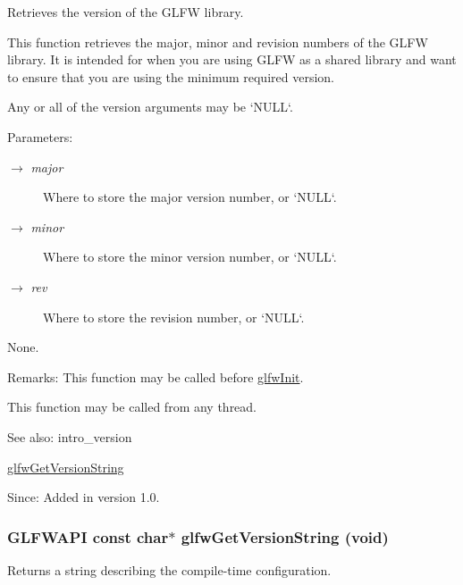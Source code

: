Retrieves the version of the GLFW library. 

This function retrieves the major, minor and revision numbers of the GLFW library. It is intended for when you are using GLFW as a shared library and want to ensure that you are using the minimum required version.

Any or all of the version arguments may be `NULL`.

\begin{Desc}
\item[Parameters:]
\begin{description}
\item[\mbox{$\rightarrow$} {\em major}]Where to store the major version number, or `NULL`. \item[\mbox{$\rightarrow$} {\em minor}]Where to store the minor version number, or `NULL`. \item[\mbox{$\rightarrow$} {\em rev}]Where to store the revision number, or `NULL`.\end{description}
\end{Desc}
None.

\begin{Desc}
\item[Remarks:]This function may be called before \hyperlink{group__init_gb41771f0215a2e0afb4cf1cf98082d40}{glfwInit}.\end{Desc}
This function may be called from any thread.

\begin{Desc}
\item[See also:]intro\_\-version 

\hyperlink{group__init_g4b9092ac5eace57d94d3cd551d6b8ded}{glfwGetVersionString}\end{Desc}
\begin{Desc}
\item[Since:]Added in version 1.0. \end{Desc}
\hypertarget{group__init_g4b9092ac5eace57d94d3cd551d6b8ded}{
\subsubsection[glfwGetVersionString]{\setlength{\rightskip}{0pt plus 5cm}GLFWAPI const char$\ast$ glfwGetVersionString (void)}}
\label{group__init_g4b9092ac5eace57d94d3cd551d6b8ded}


Returns a string describing the compile-time configuration. 

